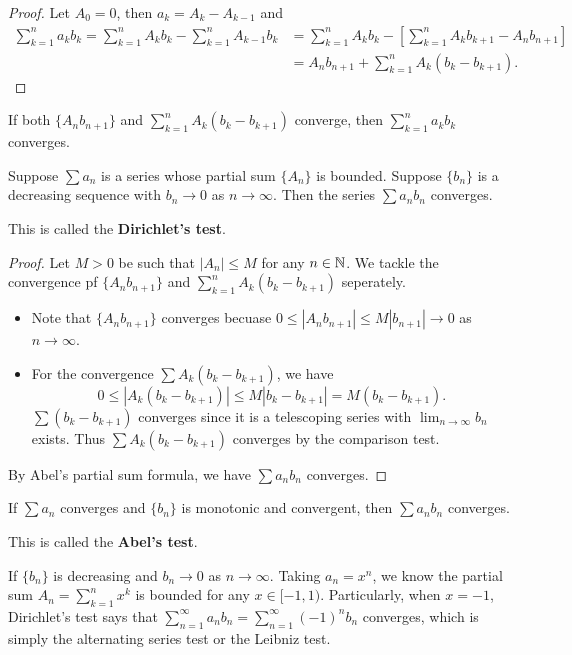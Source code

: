 \documentclass[a4paper]{ctexart}
\begin{document}
    \begin{proof}
        Let $A_0=0$, then $a_k = A_k - A_{k-1}$ and 
        \[
        \begin{aligned}
            \sum_{k=1}^n a_k b_k = \sum_{k=1}^n A_k b_k - \sum_{k=1}^n A_{k-1} b_k &= \sum_{k=1}^n A_k b_k - \left[ \sum_{k=1}^n A_kb_{k+1} - A_nb_{n+1} \right]\\ &= A_n b_{n+1} + \sum_{k=1}^n A_k (b_k - b_{k+1}).
        \end{aligned}
        \]
    \end{proof}
    \begin{myrmk}
        If both $\{A_nb_{n+1}\}$ and $\displaystyle \sum_{k=1}^n A_k (b_k - b_{k+1})$ converge, then $\displaystyle \sum_{k=1}^n a_k b_k$ converges.
    \end{myrmk}
    
    \begin{mythm}
        Suppose $\sum a_n$ is a series whose partial sum $\{A_n\}$ is bounded. Suppose $\{b_n\}$ is a decreasing sequence with $b_n \to 0$ as $n\to \infty$. Then the series $ \sum a_n b_n$ converges.

        This  is called the \textbf{Dirichlet's test}.
    \end{mythm}
    \begin{proof}
        Let $M>0$ be such that $|A_n| \le M$ for any $n\in \mathbb{N}$. We tackle the convergence pf $\{A_n b_{n+1}\}$ and $\displaystyle \sum_{k=1}^n A_k (b_k - b_{k+1}) $ seperately. 
        
        \begin{itemize}
            \item Note that $\{A_nb_{n+1}\}$ converges becuase $0 \le |A_n b_{n+1} | \le M |b_{n+1}| \to 0$ as $n\to \infty$. 
            \item For the convergence $\sum A_k(b_k - b_{k+1})$, we have
            \[
            0 \le |A_k(b_k - b_{k+1})| \le M|b_k - b_{k+1}| = M(b_k - b_{k+1}).
            \]
            $\sum (b_k - b_{k+1})$ converges since it is a telescoping series with $\displaystyle \lim_{n\to \infty} b_n$ exists. Thus $\sum A_k(b_k - b_{k+1})$ converges by the comparison test.
        \end{itemize}
        By Abel's partial sum formula, we have $\sum a_n b_n$ converges.
    \end{proof}
    \begin{mythm}
        If $\sum a_n$ converges and $\{b_n\}$ is monotonic and convergent, then $\sum a_n b_n$ converges.

        This is called the \textbf{Abel's test}.
    \end{mythm}
    \begin{myrmk}
        If $\{b_n\}$ is decreasing and $b_n \to 0$ as $n\to \infty$. Taking $a_n = x^n$, we know the partial sum $\displaystyle A_n = \sum_{k=1}^n x^k$ is bounded for any $x\in [-1,1)$. Particularly, when $x=-1$, Dirichlet's test  says that $\displaystyle \sum_{n=1}^\infty a_nb_n = \sum_{n=1}^\infty (-1)^n b_n$ converges, which is simply the alternating series test or the Leibniz test.
    \end{myrmk}
\end{document}
